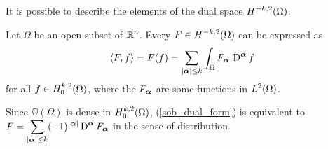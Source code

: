 It is possible to describe the elements of the dual space
$\displaystyle H^{-k,2}(\Omega)$.

\begin{theorem}
Let $\Omega$ be an open subset of $\displaystyle \mathbb{R}^n$.  Every
$\displaystyle F\in H^{-k,2}(\Omega)$ can be expressed as
\begin{equation} \label{sob_dual_form}
\left\langle{F} , {f}\right\rangle = F(f) = \sum_{|{\bm{\alpha}}|\leq k} \int_\Omega
F_{{\bm{\alpha}}}\,\operatorname{D}^{{\bm{\alpha}}} f
\end{equation}
for all $\displaystyle f \in H^{k,2}_0(\Omega)$, where the $F_{{\bm{\alpha}}}$
are some functions in $\displaystyle L^2(\Omega)$.
\end{theorem}

\begin{rmk}
Since $\DD(\Omega)$ is dense in $\displaystyle H^{k,2}_0(\Omega)$,
(\ref{sob_dual_form}) is equivalent to
$\displaystyle F = \sum_{|{\bm{\alpha}}|\leq k} (-1)^{|{\bm{\alpha}}|}
\operatorname{D}^{{\bm{\alpha}}} F_{{\bm{\alpha}}}$ in the sense of distribution.
\end{rmk}

